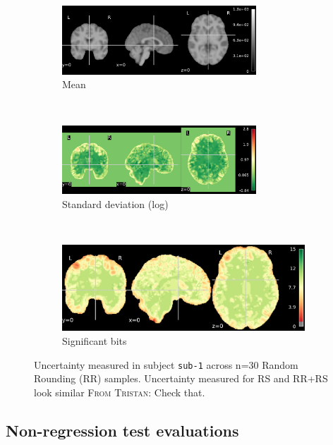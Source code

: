 \documentclass{article}
\newcommand{\TG}[1]{\color{blue}\textsc{From Tristan:} #1\color{black}\xspace}
\begin{document}
\begin{figure}
    \centering
    \begin{subfigure}[t]{\textwidth}
         \centering
         \includegraphics[width=0.8\textwidth]{figures/mean.pdf}
         \caption{\centering Mean}
     \end{subfigure}\\
     \begin{subfigure}[t]{\textwidth}
         \centering
         \includegraphics[width=0.8\textwidth]{figures/std.pdf}
         \caption{\centering Standard deviation (log)}
     \end{subfigure}\\
        \begin{subfigure}[t]{0.8\textwidth}
         \centering
         \includegraphics[width=\textwidth]{figures/sig.pdf}
         \caption{\centering Significant bits}
     \end{subfigure}
     \caption{Uncertainty measured in subject \texttt{sub-1} across n=30 Random Rounding (RR) samples. Uncertainty measured for RS and RR+RS look similar \TG{Check that}. }
    \label{fig:uncertainty_sub_1}
\end{figure}

\subsection{Non-regression test evaluations}
\end{document}
